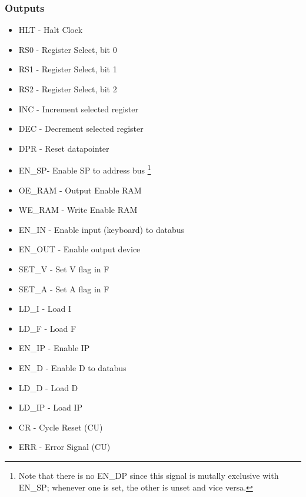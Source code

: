 \subsubsection*{Outputs}
\begin{itemize}
\itemsep0em 
\item HLT - Halt Clock
\item RS0 - Register Select, bit 0
\item RS1 - Register Select, bit 1
\item RS2 - Register Select, bit 2
\item INC - Increment selected register
\item DEC - Decrement selected register
\item DPR - Reset datapointer
\item EN\_SP- Enable SP to address bus \footnote{Note that there is no EN\_DP since this signal is mutally exclusive with EN\_SP; whenever one is set, the other is unset and vice versa.}
\item OE\_RAM - Output Enable RAM
\item WE\_RAM - Write Enable RAM
\item EN\_IN - Enable input (keyboard) to databus
\item EN\_OUT - Enable output device
\item SET\_V - Set V flag in F
\item SET\_A - Set A flag in F
\item LD\_I - Load I
\item LD\_F - Load F
\item EN\_IP - Enable IP
\item EN\_D - Enable D to databus
\item LD\_D - Load D
\item LD\_IP - Load IP
\item CR - Cycle Reset (CU)
\item ERR - Error Signal (CU)
\end{itemize}


